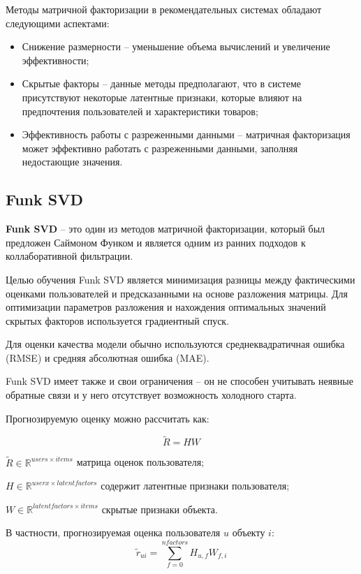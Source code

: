 Методы матричной факторизации в рекомендательных системах обладают следующими аспектами:

\begin{itemize}
	\item Снижение размерности -- уменьшение объема вычислений и увеличение эффективности;
	\item Скрытые факторы -- данные методы предполагают, что в системе присутствуют некоторые латентные признаки, которые влияют на предпочтения пользователей и характеристики товаров;
	\item Эффективность работы с разреженными данными -- матричная факторизация может эффективно работать с разреженными данными, заполняя недостающие значения.
\end{itemize}

\subsection{Funk SVD}
\textbf{Funk SVD} -- это один из методов матричной факторизации, который был предложен Саймоном Функом и является одним из ранних подходов к коллаборативной фильтрации.

Целью обучения Funk SVD является минимизация разницы между фактическими оценками пользователей и предсказанными на основе разложения матрицы. Для оптимизации параметров разложения и нахождения оптимальных значений скрытых факторов используется градиентный спуск. \cite{svd}

Для оценки качества модели обычно используются среднеквадратичная ошибка (RMSE) и средняя абсолютная ошибка (MAE).

Funk SVD имеет также и свои ограничения -- он не способен учитывать неявные обратные связи и у него отсутствует возможность холодного старта.

Прогнозируемую оценку можно рассчитать как:

\begin{equation}
	\widetilde{R} = HW
\end{equation}
\begin{eqexpl}[35mm]
\item{$\widetilde{R} \in \mathbb{R}^{users \times items}$} матрица оценок пользователя;
\item{$H \in \mathbb{R}^{userx \times latent factors}$} содержит латентные признаки пользователя;
\item{$W \in \mathbb{R}^{latent factors \times items}$} скрытые признаки объекта.
\end{eqexpl}

В частности, прогнозируемая оценка пользователя $u$ объекту $i$:
\begin{equation}
	\widetilde{r}_{ui} = \sum^{n factors}_{f = 0} H_{u, f} W_{f, i}
\end{equation}

\pagebreak